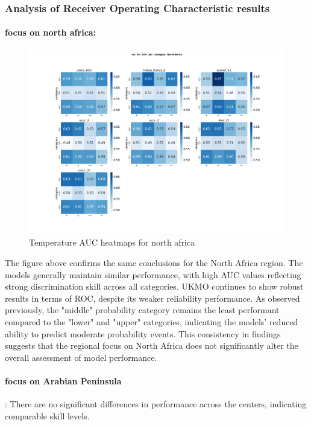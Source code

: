 \subsubsection{Analysis of Receiver Operating Characteristic results}
\paragraph{focus on north africa:}
\begin{figure}[H]
\includegraphics[scale=0.3]{plots/prob/roc/roc_T2M_category_NorthAfrica.png}

\caption{Temperature AUC  heatmaps for north africa }
\end{figure}

The figure above confirms the same conclusions for the North Africa region. The models generally maintain similar performance, with high AUC values reflecting strong discrimination skill across all categories. UKMO continues to show robust results in terms of ROC, despite its weaker reliability performance. As observed previously, the "middle" probability category remains the least performant compared to the "lower" and "upper" categories, indicating the models' reduced ability to predict moderate probability events. This consistency in findings suggests that the regional focus on North Africa does not significantly alter the overall assessment of model performance.
\paragraph{focus on Arabian Peninsula}:
There are no significant differences in performance across the centers, indicating comparable skill levels.
